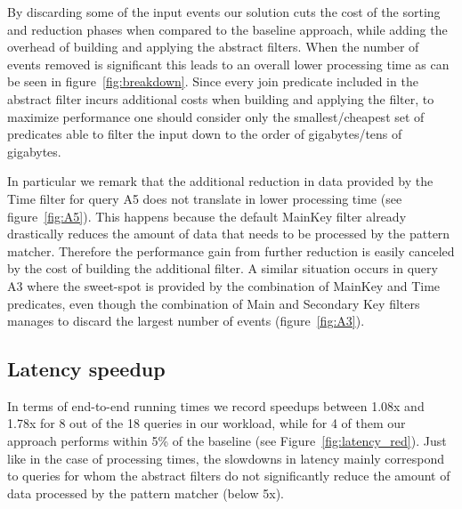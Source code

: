 By discarding some of the input events our solution cuts the cost
of the sorting and reduction phases when compared to the baseline approach,
while adding the overhead of building and applying the abstract filters.
When the number of events removed is significant this leads to an overall lower
processing time as can be seen in figure~\ref{fig:breakdown}.
Since every join predicate included in the abstract filter incurs additional
costs when building and applying the filter, to maximize performance one should
consider only the smallest/cheapest set of predicates able to filter the input
down to the order of gigabytes/tens of gigabytes.


In particular we remark that the additional reduction in data provided by the
Time filter for query A5 does not translate in lower processing time (see
figure~\ref{fig:A5}).
This happens because the default MainKey filter already drastically reduces
the amount of data that needs to be processed by the pattern matcher. 
Therefore the performance gain from further reduction is easily canceled by the
cost of building the additional filter.
A similar situation occurs in query A3 where the sweet-spot is provided by the
combination of MainKey and Time predicates, even though the combination of
Main and Secondary Key filters manages to discard the largest number of events 
(figure~\ref{fig:A3}).


\subsection{Latency speedup}


In terms of end-to-end running times we record speedups between 1.08x and 1.78x
for 8 out of the 18 queries in our workload, while for 4 of them our
approach performs within 5\% of the baseline (see Figure~\ref{fig:latency_red}).
Just like in the case of processing times, the slowdowns in latency mainly
correspond to queries for whom the abstract filters do not significantly reduce
the amount of data processed by the pattern matcher (below 5x).


